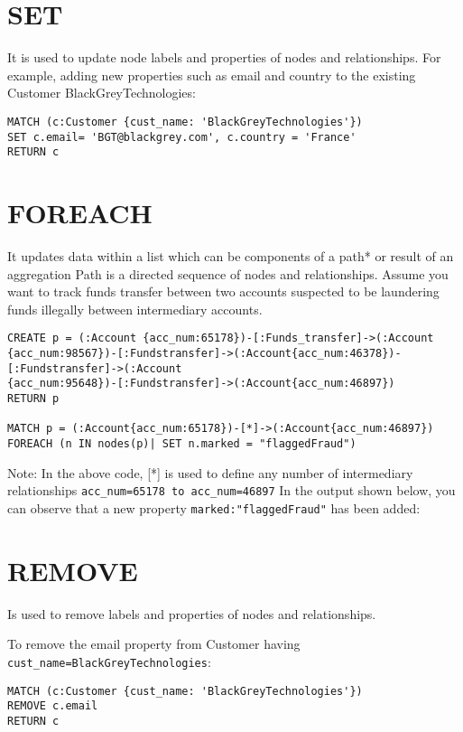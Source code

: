 \documentclass[../main.tex]{subfiles}
\begin{document}
\section{SET}
It is used to update node labels and properties of nodes and relationships.
For example, adding new properties such as email and country to the existing Customer BlackGreyTechnologies:

\begin{lstlisting}[language=cypher, caption={Match example}]
MATCH (c:Customer {cust_name: 'BlackGreyTechnologies'})  
SET c.email= 'BGT@blackgrey.com', c.country = 'France' 
RETURN c
\end{lstlisting}


\section{FOREACH}
It updates data within a list which can be components of a path* or result of an aggregation
Path is a directed sequence of nodes and relationships.
Assume you want to track funds transfer between two accounts suspected to be laundering funds illegally between intermediary accounts.
\begin{lstlisting}[language=cypher]
CREATE p = (:Account {acc_num:65178})-[:Funds_transfer]->(:Account
{acc_num:98567})-[:Fundstransfer]->(:Account{acc_num:46378})-[:Fundstransfer]->(:Account
{acc_num:95648})-[:Fundstransfer]->(:Account{acc_num:46897})
RETURN p

MATCH p = (:Account{acc_num:65178})-[*]->(:Account{acc_num:46897}) 
FOREACH (n IN nodes(p)| SET n.marked = "flaggedFraud")

\end{lstlisting}
Note: In the above code, [*] is used to define any number of intermediary relationships \lstinline{acc_num=65178 to acc_num=46897}
In the output shown below, you can observe that a new property \lstinline{marked:"flaggedFraud"} has been added:

\section{REMOVE}
Is used to remove labels and properties of nodes and relationships.

To remove the email property from Customer having \lstinline{cust_name=BlackGreyTechnologies}:
\begin{lstlisting}[language=cypher]
MATCH (c:Customer {cust_name: 'BlackGreyTechnologies'}) 
REMOVE c.email
RETURN c
\end{lstlisting}
\end{document}
